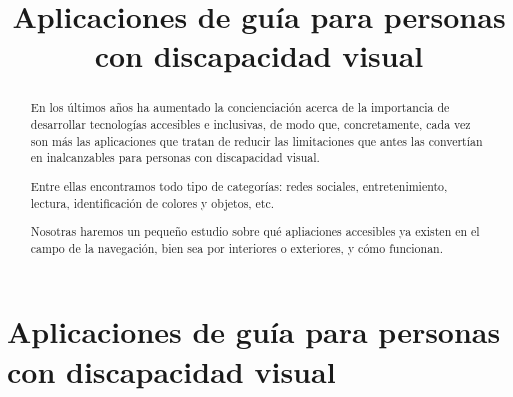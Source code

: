 \documentclass{article}
\title{\Huge Aplicaciones de guía para personas con discapacidad visual}
\begin{document}
	
	\begin{titlepage}
		\maketitle
		\thispagestyle{empty}
	\end{titlepage}
	
	\begin{abstract}
	    En los últimos años ha aumentado la concienciación acerca de la importancia de desarrollar tecnologías accesibles e inclusivas, de modo que, concretamente, cada vez son más las aplicaciones que tratan de reducir las limitaciones que antes las convertían en inalcanzables para personas con discapacidad visual.
	    
	    Entre ellas encontramos todo tipo de categorías: redes sociales, entretenimiento, lectura, identificación de colores y objetos, etc. 
	    
	    Nosotras haremos un pequeño estudio sobre qué apliaciones accesibles ya existen en el campo de la navegación, bien sea por interiores o exteriores, y cómo funcionan.
	
	\end{abstract}
	
	
	\section{Aplicaciones de guía para personas con discapacidad visual}
	
\end{document}

